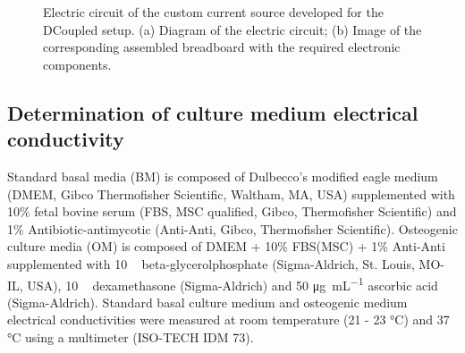 \begin{figure}
\caption{Electric circuit of the custom current source developed for the \acs{DCoupled} setup. (a) Diagram of the electric circuit; (b) Image of the corresponding assembled breadboard with the required electronic components.}
\label{fig4d2}
\end{figure} 

\subsection{Determination of culture medium electrical conductivity}
Standard basal media (BM) is composed of Dulbecco’s modified eagle medium (DMEM, Gibco Thermofisher Scientific, Waltham, MA, USA) supplemented with 10\si{\percent} fetal bovine serum (FBS, MSC qualified, Gibco, Thermofisher Scientific) and 1\si{\percent} Antibiotic-antimycotic (Anti-Anti, Gibco, Thermofisher Scientific). Osteogenic culture media (OM) is composed of DMEM + 10\si{\percent} FBS(MSC) + 1\si{\percent} Anti-Anti supplemented with 10 \si{\milli\molar} beta-glycerolphosphate (Sigma-Aldrich, St. Louis, MO-IL, USA), 10  \si{\nano\molar} dexamethasone (Sigma-Aldrich) and 50 \si{\micro\gram\per\milli\liter} ascorbic acid (Sigma-Aldrich). Standard basal culture medium and osteogenic medium electrical conductivities were measured at room temperature (21 - 23 \si{\celsius}) and 37 \si{\celsius} using a multimeter (ISO-TECH IDM 73).
 
